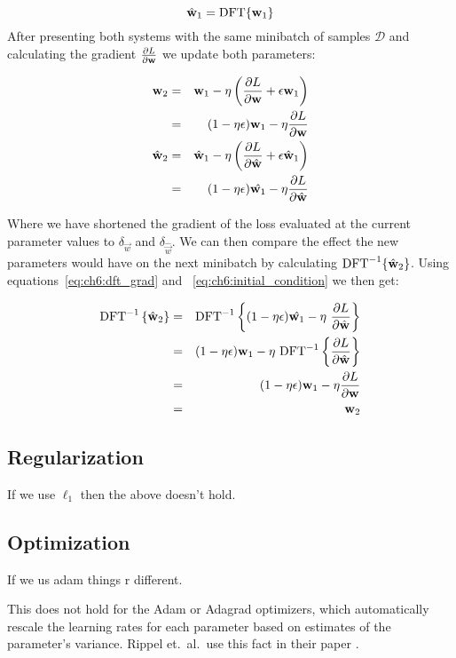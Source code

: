 \begin{equation}
  \hat{\mathbf{w}}_1 = \mathrm{DFT}\{\mathbf{w}_1\} \label{eq:ch6:initial_condition}
\end{equation}
%
After presenting both systems with the same minibatch of samples $\mathcal{D}$
and calculating the gradient $\frac{\partial L}{\partial \mathbf{w}}$ we update both parameters:

\begin{eqnarray}
  \mathbf{w}_2 & = & \mathbf{w}_1 - \eta \left(
    \frac{\partial L}{\partial \mathbf{w}} + \epsilon \mathbf{w}_1 \right) \\
    &=& (1-\eta\epsilon)\mathbf{w}_1 - \eta \frac{\partial L}{\partial \mathbf{w}} \\
  \hat{\mathbf{w}}_2 & = & \hat{\mathbf{w}}_1 - \eta \left(
     \frac{\partial L}{\partial \hat{\mathbf{w}}} + \epsilon \hat{\mathbf{w}}_1 \right)  \\
     &=& (1-\eta\epsilon)\hat{\mathbf{w}_1} - \eta \frac{\partial L}{\partial \hat{\mathbf{w}}} \\
\end{eqnarray}

Where we have shortened the gradient of the loss evaluated at the current
parameter values to $\delta_{\vec{w}}$ and $\delta_{\hat{\vec{w}}}$.
We can then compare the effect the new parameters would have on the next
minibatch by calculating $\mathrm{DFT}^{-1} \{\hat{\mathbf{w}}_2 \}$. Using
equations~\ref{eq:ch6:dft_grad} and ~\ref{eq:ch6:initial_condition} we then get:

\begin{eqnarray}
  \IFT{\hat{\vec{w}}_2} &=& \IFT{(1-\eta\epsilon)\hat{\vec{w}_1} - \eta\ \dydx{L}{\hat{\vec{w}}}} \\       
                        & = & (1-\eta\epsilon)\vec{w}_1 - \eta\ \IFT{ \dydx{L}{\hat{\vec{w}}}} \\
                        & = & (1-\eta\epsilon)\vec{w}_1 - \eta \dydx{L}{\vec{w}} \\
                        & = & \vec{w}_2
\end{eqnarray}


\subsection{Regularization}
If we use $\ell_1$ then the above doesn't hold.

\subsection{Optimization}
If we us adam things r different.

This does not hold for the Adam \cite{kingma_adam:_2014} or Adagrad \cite{}
optimizers, which automatically rescale the learning rates for each parameter
based on estimates of the parameter's variance. Rippel et.\ al.\ use this fact
in their paper \cite{rippel_spectral_2015}.

